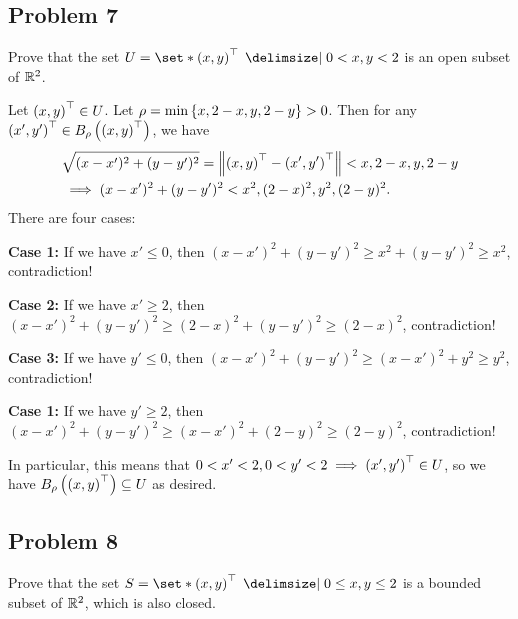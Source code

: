 \documentclass[main.tex]{subfiles}
\begin{document}
\subsection{Problem 7}
\begin{claim}
    Prove that the set $U = \set*{\parens{x,y}^\top \mid 0 < x,y < 2}$ is an open subset of $\mathbb R^2$.
\end{claim}

\begin{soln}
    Let $\left( x, y \right)^\top \in U$. Let $\rho = \min\left\{ x, 2 - x, y, 2 - y \right\} > 0$. Then for any $\left( x', y' \right)^\top \in B_\rho\left( \left( x, y \right)^\top \right)$, we have
    \begin{align*}
        &\sqrt{(x - x')^2 + (y - y')^2} = \left\lVert \left( x, y \right)^\top - \left( x', y' \right)^\top \right\rVert < x, 2 - x, y, 2 - y \\
        &\implies (x - x')^2 + (y - y')^2 < x^2, (2 - x)^2, y^2, (2 - y)^2.
    \end{align*}
    There are four cases:
    
    \textbf{Case 1:} If we have $x' \le 0$, then $(x - x')^2 + (y - y')^2 \ge x^2 + (y - y')^2 \ge x^2$, contradiction!
    
    \textbf{Case 2:} If we have $x' \ge 2$, then $(x - x')^2 + (y - y')^2 \ge (2 - x)^2 + (y - y')^2 \ge (2 - x)^2$, contradiction!
    
    \textbf{Case 3:} If we have $y' \le 0$, then $(x - x')^2 + (y - y')^2 \ge (x - x')^2 + y^2 \ge y^2$, contradiction!
    
    \textbf{Case 1:} If we have $y' \ge 2$, then $(x - x')^2 + (y - y')^2 \ge (x - x')^2 + (2 - y)^2 \ge (2 - y)^2$, contradiction!

    In particular, this means that $0 < x' < 2, 0 < y' < 2\implies \left( x', y' \right)^\top \in U$, so we have $B_\rho\left( \left( x, y \right)^\top \right)\subseteq U$ as desired.
\end{soln}
\eject

\subsection{Problem 8}
\begin{claim}
    Prove that the set $S = \set*{\parens{x,y}^\top \mid 0 \le  x,y \le  2}$ is a bounded subset of $\mathbb R^2$, which is also closed.
\end{claim}
\end{document}
